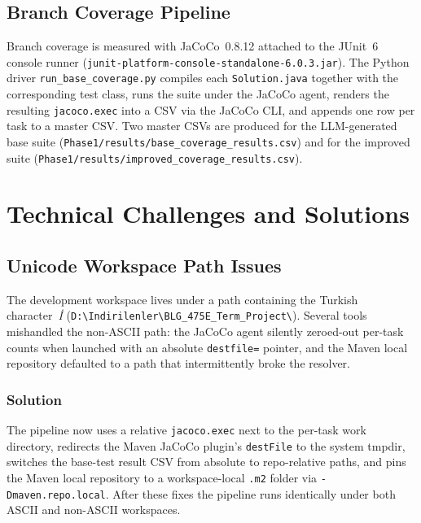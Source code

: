 \documentclass[journal]{IEEEtran}
\begin{document}
\subsection{Branch Coverage Pipeline}

Branch coverage is measured with JaCoCo~0.8.12 attached to the JUnit~6
console runner (\texttt{junit-platform-console-standalone-6.0.3.jar}). The
Python driver \texttt{run\_base\_coverage.py} compiles each
\texttt{Solution.java} together with the corresponding test class, runs the
suite under the JaCoCo agent, renders the resulting \texttt{jacoco.exec}
into a CSV via the JaCoCo CLI, and appends one row per task to a master
CSV. Two master CSVs are produced for the LLM-generated base suite
(\texttt{Phase1/results/base\_coverage\_results.csv}) and for the improved
suite (\texttt{Phase1/results/improved\_coverage\_results.csv}).

\section{Technical Challenges and Solutions}\label{sec:challenges}

\subsection{Unicode Workspace Path Issues}

The development workspace lives under a path containing the Turkish
character~\emph{\.{I}} (\verb|D:\Indirilenler\BLG_475E_Term_Project\|).
Several tools mishandled the non-ASCII path: the JaCoCo agent silently
zeroed-out per-task counts when launched with an absolute
\texttt{destfile=} pointer, and the Maven local repository defaulted to a
path that intermittently broke the resolver.

\subsubsection{Solution}
The pipeline now uses a relative \texttt{jacoco.exec} next to the per-task
work directory, redirects the Maven JaCoCo plugin's \texttt{destFile} to
the system tmpdir, switches the base-test result CSV from absolute to
repo-relative paths, and pins the Maven local repository to a
workspace-local \texttt{.m2} folder via \texttt{-Dmaven.repo.local}. After
these fixes the pipeline runs identically under both ASCII and non-ASCII
workspaces.
\end{document}
